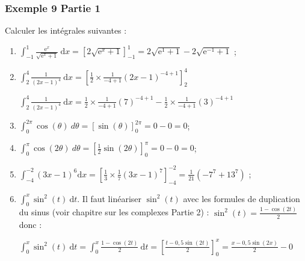 \documentclass[11pt, hyperref={urlcolor=red,%
            linkcolor=blue, %
            colorlinks=true}]{beamer}
\newcommand{\dx}{\ensuremath{\text{d}x}}		%
\newcommand{\dt}{\ensuremath{\text{d}t}}		%
\begin{document}
\begin{frame}
\frametitle{Exemple  9 Partie 1}
\label{exemple9}

Calculer les intégrales suivantes :

			\begin{enumerate}
			\item $\int_{-1}^{1}\frac{\text{e}^x}{\sqrt{\text{e}^x+1}} \ \dx = \left[2\sqrt{\text{e}^x+1}\right]_{-1}^{1}=2\sqrt{\text{e}^{1}+1}-2\sqrt{\text{e}^{-1}+1}$  ;
				\item $\int_{2}^{4}\frac{1}{(2x-1)^4} \ \dx =   \left[\frac{1}{2}\times \frac{1}{-4+1}(2x-1)^{-4+1}\right]_{2}^{4}$
				
				$\int_{2}^{4}\frac{1}{(2x-1)^4} \ \dx = \frac{1}{2}\times \frac{1}{-4+1}(7)^{-4+1}- \frac{1}{2}\times \frac{1}{-4+1}(3)^{-4+1}$
				
				\item $\int_{0}^{2\pi} \cos\left( \theta \right)  \ d\theta  =  \left[\sin\left( \theta \right)\right]_{0}^{2\pi}=0-0=0$;
				
				\item $\int_{0}^{\pi} \cos \left( 2\theta \right)  \ d\theta =  \left[\frac{1}{2}\sin\left( 2\theta \right)\right]_{0}^{\pi}=0-0=0$;
							
				\item $\int_{-4}^{-2}(3x-1)^6 \dx = \left[\frac{1}{3}\times \frac{1}{7}(3x-1)^{7}\right]_{-4}^{-2}=\frac{1}{21}\left(-7^{7}+13^{7} \right)$ ;
				\item $\int_{0}^{x}\sin^2(t) \ \dt$. Il faut linéariser $\sin^{2}(t)$ avec les formules de duplication du sinus (voir chapitre sur les complexes Partie 2) : $\sin^{2}(t)=\frac{1-\cos(2t)}{2}$ donc :
				
				$\int_{0}^{x}\sin^2(t) \ \dt = \int_{0}^{x}\frac{1-\cos(2t)}{2}\ \dt  = \left[\frac{t-0,5\sin(2t)}{2}\right]_{0}^{x}= \frac{x-0,5\sin(2x)}{2}-0$
				
		
			\end{enumerate}

\end{frame}
\end{document}
